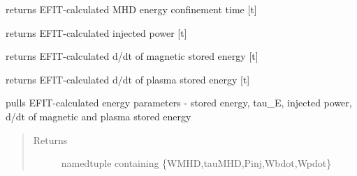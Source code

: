 \documentclass[letterpaper,10pt,english]{sphinxmanual}
\begin{document}
\begin{fulllineitems}
\begin{fulllineitems}
\end{fulllineitems}


\begin{fulllineitems}
\label{eqtools:eqtools.EFIT.EFITTree.getTauMHD}
returns EFIT-calculated MHD energy confinement time {[}t{]}

\end{fulllineitems}


\begin{fulllineitems}
\label{eqtools:eqtools.EFIT.EFITTree.getPinj}
returns EFIT-calculated injected power {[}t{]}

\end{fulllineitems}


\begin{fulllineitems}
\label{eqtools:eqtools.EFIT.EFITTree.getWbdot}
returns EFIT-calculated d/dt of magnetic stored energy {[}t{]}

\end{fulllineitems}


\begin{fulllineitems}
\label{eqtools:eqtools.EFIT.EFITTree.getWpdot}
returns EFIT-calculated d/dt of plasma stored energy {[}t{]}

\end{fulllineitems}


\begin{fulllineitems}
\label{eqtools:eqtools.EFIT.EFITTree.getEnergy}
pulls EFIT-calculated energy parameters - stored energy, tau\_E, injected power, d/dt of magnetic and plasma stored energy
\begin{quote}\begin{description}
\item[{Returns}] \leavevmode
namedtuple containing \{WMHD,tauMHD,Pinj,Wbdot,Wpdot\}

\end{description}\end{quote}


\end{fulllineitems}
\end{fulllineitems}
\end{document}
